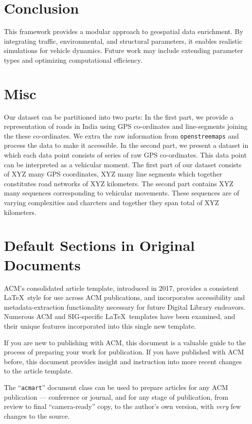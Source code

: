\documentclass[sigplan,screen]{acmart}
\begin{document}
\section{Conclusion}
This framework provides a modular approach to geospatial data enrichment. By integrating traffic, environmental, and structural parameters, it enables realistic simulations for vehicle dynamics. Future work may include extending parameter types and optimizing computational efficiency.


\section{Misc}

Our dataset can be partitioned into two parts:
In the first part, we provide a representation of roads in India
using GPS co-ordinates and line-segments joining the 
these co-ordinates.
We extra the raw information from \texttt{openstreemaps}
and process the data to make it accessible.
In the second part, we present a dataset 
in which each data point consists of series 
of raw GPS co-ordinates.
This data point can be interpreted as a vehicular moment. 
The first part of our dataset consists of XYZ many GPS coordinates,
XYZ many line segments which together constitutes road networks
of XYZ kilometers.
The second part contains XYZ many sequences corresponding
to vehicular movements.
These sequences are of varying complexities and charcters
and together they span total of XYZ kilometers. 


\newpage

\section{Default Sections in Original Documents}

ACM's consolidated article template, introduced in 2017, provides a
consistent \LaTeX\ style for use across ACM publications, and
incorporates accessibility and metadata-extraction functionality
necessary for future Digital Library endeavors. Numerous ACM and
SIG-specific \LaTeX\ templates have been examined, and their unique
features incorporated into this single new template.

If you are new to publishing with ACM, this document is a valuable
guide to the process of preparing your work for publication. If you
have published with ACM before, this document provides insight and
instruction into more recent changes to the article template.

The ``\verb|acmart|'' document class can be used to prepare articles
for any ACM publication --- conference or journal, and for any stage
of publication, from review to final ``camera-ready'' copy, to the
author's own version, with {\itshape very} few changes to the source.
\end{document}
